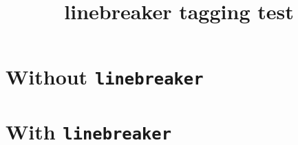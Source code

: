 \documentclass{article}
\title{linebreaker tagging test}
\begin{document}
\section{Without \texttt{linebreaker}}
\linebreakerdisable
\kant[1]

\section{With \texttt{linebreaker}}
\linebreakerenable
\kant[1]
\end{document}
